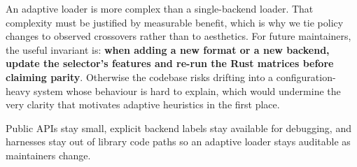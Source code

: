 An adaptive loader is more complex than a single-backend loader. That complexity must be justified by measurable benefit, which is why we tie policy changes to observed crossovers rather than to aesthetics. For future maintainers, the useful invariant is: \textbf{when adding a new format or a new backend, update the selector's features and re-run the Rust matrices before claiming parity}. Otherwise the codebase risks drifting into a configuration-heavy system whose behaviour is hard to explain, which would undermine the very clarity that motivates adaptive heuristics in the first place.

Public APIs stay small, explicit backend labels stay available for debugging, and harnesses stay out of library code paths so an adaptive loader stays auditable as maintainers change.
